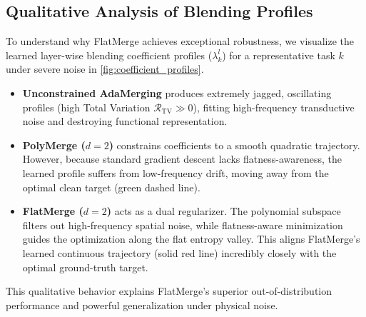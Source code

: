 \subsection{Qualitative Analysis of Blending Profiles}
To understand why FlatMerge achieves exceptional robustness, we visualize the learned layer-wise blending coefficient profiles ($\lambda_k^l$) for a representative task $k$ under severe noise in \cref{fig:coefficient_profiles}.
\begin{itemize}
    \item \textbf{Unconstrained AdaMerging} produces extremely jagged, oscillating profiles (high Total Variation $\mathcal{R}_{\text{TV}} \gg 0$), fitting high-frequency transductive noise and destroying functional representation.
    \item \textbf{PolyMerge ($d=2$)} constrains coefficients to a smooth quadratic trajectory. However, because standard gradient descent lacks flatness-awareness, the learned profile suffers from low-frequency drift, moving away from the optimal clean target (green dashed line).
    \item \textbf{FlatMerge ($d=2$)} acts as a dual regularizer. The polynomial subspace filters out high-frequency spatial noise, while flatness-aware minimization guides the optimization along the flat entropy valley. This aligns FlatMerge's learned continuous trajectory (solid red line) incredibly closely with the optimal ground-truth target.
\end{itemize}
This qualitative behavior explains FlatMerge's superior out-of-distribution performance and powerful generalization under physical noise.
